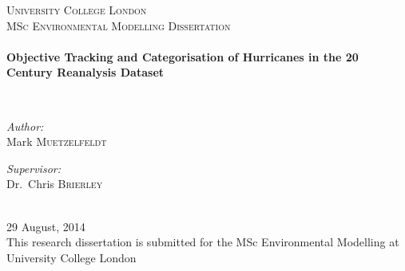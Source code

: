 \begin{titlepage}

\begin{center}

\textsc{\LARGE University College London}\\[1.5cm]

\textsc{\Large MSc Environmental Modelling Dissertation}\\[0.5cm]

\HRule \\[0.4cm]
{ \LARGE \bfseries Objective Tracking and Categorisation of Hurricanes in the 20 Century Reanalysis Dataset \\[0.4cm] }

\HRule \\[1.5cm]

\begin{minipage}{0.4\textwidth}
\begin{flushleft} \large
\emph{Author:}\\
Mark \textsc{Muetzelfeldt}
\end{flushleft}
\end{minipage}
\begin{minipage}{0.4\textwidth}
\begin{flushright} \large
\emph{Supervisor:} \\
Dr.~Chris \textsc{Brierley}
\end{flushright}
\end{minipage}
\\[0.5cm]
29 August, 2014
\\[0.5cm]

This research dissertation is submitted for the MSc Environmental Modelling at University College London


\vfill

\end{center}

\end{titlepage}
